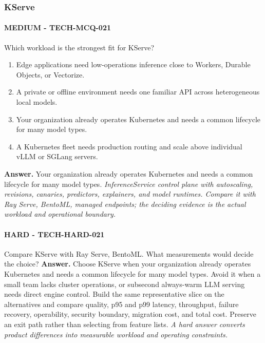 \subsubsection*{KServe}
\paragraph{MEDIUM - TECH-MCQ-021} Which workload is the strongest fit for KServe?
\begin{enumerate}[label=\Alph*.]
\item Edge applications need low-operations inference close to Workers, Durable Objects, or Vectorize.
\item A private or offline environment needs one familiar API across heterogeneous local models.
\item Your organization already operates Kubernetes and needs a common lifecycle for many model types.
\item A Kubernetes fleet needs production routing and scale above individual vLLM or SGLang servers.
\end{enumerate}
\textbf{Answer.} Your organization already operates Kubernetes and needs a common lifecycle for many model types.
\textit{InferenceService control plane with autoscaling, revisions, canaries, predictors, explainers, and model runtimes. Compare it with Ray Serve, BentoML, managed endpoints; the deciding evidence is the actual workload and operational boundary.}
\paragraph{HARD - TECH-HARD-021} Compare KServe with Ray Serve, BentoML. What measurements would decide the choice?
\textbf{Answer.} Choose KServe when your organization already operates Kubernetes and needs a common lifecycle for many model types. Avoid it when a small team lacks cluster operations, or subsecond always-warm LLM serving needs direct engine control. Build the same representative slice on the alternatives and compare quality, p95 and p99 latency, throughput, failure recovery, operability, security boundary, migration cost, and total cost. Preserve an exit path rather than selecting from feature lists.
\textit{A hard answer converts product differences into measurable workload and operating constraints.}
